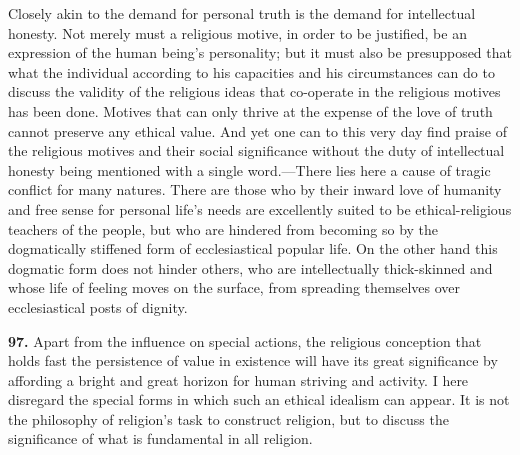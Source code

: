 \documentclass[12pt,a4paper]{book}
\newcommand{\opage}[1]{\marginnote{\footnotesize\textit{[#1]}}}
\begin{document}
Closely akin to the demand for personal truth is the demand for intellectual honesty. Not merely must a
religious motive, in order to be justified, be an expression of the human being's personality; but it must
also be presupposed that what the individual according to his capacities and his circumstances can do to
discuss the validity of the religious ideas that co-operate in the religious motives has been done. Motives
that can only thrive at the expense of the love of truth cannot preserve any ethical value. And yet one can
to this very day find praise of the 
\opage{221}religious motives and their social significance without the duty of
intellectual honesty being mentioned with a single word.---There lies here a cause of tragic conflict for
many natures. There are those who by their inward love of humanity and free sense for personal life's needs
are excellently suited to be ethical-religious teachers of the people, but who are hindered from becoming so
by the dogmatically stiffened form of ecclesiastical popular life. On the other hand this dogmatic form does
not hinder others, who are intellectually thick-skinned and whose life of feeling moves on the surface, from
spreading themselves over ecclesiastical posts of dignity.

\medskip

\noindent\textbf{97.} Apart from the influence on special actions, the religious conception that holds fast
the persistence of value in existence will have its great significance by affording a bright and great
horizon for human striving and activity. I here disregard the special forms in which such an ethical idealism
can appear. It is not the philosophy of religion's task to construct religion, but to discuss the significance
of what is fundamental in all religion.
\end{document}
